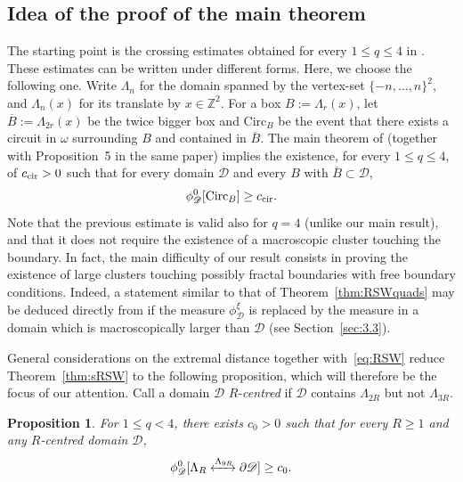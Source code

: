 \documentclass[a4paper,oneside,11pt]{article}
\newtheorem{proposition}[theorem]{Proposition}
\numberwithin{equation}{section}
\numberwithin{equation}{section}
\numberwithin{equation}{section}
\newcommand{\calD}{\mathcal{D}}
\newcommand{\bbZ}{\mathbb{Z}}
\newcommand{\La}{\Lambda}
\newcommand{\Circ}{\mathrm{Circ}}
\begin{document}
\subsection{Idea of the proof of the main theorem}\label{sec:idea}

The starting point is the crossing estimates obtained for every $1\le q\le 4$ in \cite{DumSidTas16}. These estimates can be written under different forms. Here, we choose the following one. Write $\La_n$ for the domain  spanned by the vertex-set $\{-n,\dots, n\}^2$, and $\La_n(x)$ for its translate by $x \in \bbZ^2$. 
For a box $B:=\Lambda_r(x)$, let $\overline B:=\Lambda_{2r}(x)$ be the twice bigger box and $\Circ_B$ be the event that there exists a circuit in $\omega$ surrounding $B$ and contained in $\overline B$. The main theorem of \cite{DumSidTas16} (together with Proposition~5 in the same paper) implies the existence, for every $1\le q\le 4$, of $c_{\rm cir}>0$ such that for every domain $\calD$ and every $B$ with $\overline B\subset \calD$,
\begin{equation}\label{eq:RSW}
\phi_\calD^0[\Circ_B]\ge c_{\rm cir}.
\end{equation}
Note that the previous estimate is valid also for $q=4$ (unlike our main result), 
and that it does not require the existence of a macroscopic cluster touching the boundary. 
In fact, the main difficulty of our result consists in proving the existence of large clusters touching possibly fractal boundaries with free boundary conditions. Indeed, a statement similar to that of Theorem~\ref{thm:RSWquads} may be deduced directly from \cite{DumSidTas16} if the measure $\phi_\calD^\xi$ is replaced by the measure in a domain which is macroscopically larger than $\calD$ (see Section~\ref{sec:3.3}). 


General considerations on the extremal distance together with~\eqref{eq:RSW} reduce Theorem~\ref{thm:sRSW}  to the following proposition, which will therefore be the focus of our attention. Call a domain $\calD$ $R$-{\em centred} if $\calD$ contains $\Lambda_{2R}$ but not $\Lambda_{3R}$.

\begin{proposition}\label{prop:crucial_exist}
	For $1\le q<4$, there exists $c_0>0$ such that for every $R\geq 1$ and any $R$-centred domain $\calD$, 	
	\begin{align}\label{eq:crucial_exist}
		\phi_\calD^0 [\Lambda_R\xleftrightarrow{\Lambda_{9R}}  \partial\calD]\ge  c_0.
	\end{align}
\end{proposition}
\end{document}
